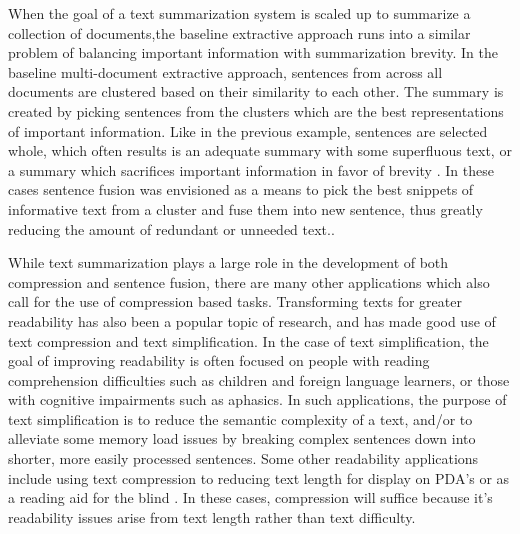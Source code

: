 {{When the goal of a text summarization system is scaled up to summarize a collection of documents,the baseline extractive approach runs into a similar problem of balancing important information with summarization brevity. In the baseline multi-document extractive approach, sentences from across all documents are clustered based on their similarity to each other.  The summary is created by picking sentences from the clusters which are the best representations of important information.  Like in the previous example, sentences are selected whole, which often results is an adequate summary with some superfluous text, or a summary which sacrifices important information in favor of brevity \citep{Filippova:2008:SFV:1613715.1613741}. In these cases sentence fusion was envisioned as a means to pick the best snippets of informative text from a cluster and fuse them into new sentence, thus greatly reducing the amount of redundant or unneeded text.\citet{bla}.}

{While text summarization plays a large role in the development of both compression and sentence fusion, there are many other applications which also call for the use of compression based tasks.  Transforming texts for greater readability has also been a popular topic of research, and has made good use of text compression and text simplification.  In the case of text simplification, the goal of improving readability is often focused on people with reading comprehension difficulties such as children and foreign language learners, or those with cognitive impairments such as aphasics\citep{Feng2008}. In such applications, the purpose of text simplification is to reduce the semantic complexity of a text, and/or to alleviate some memory load issues by breaking complex sentences down into shorter, more easily processed sentences.  Some other readability applications include using text compression to reducing text length for display on PDA's \citep{Corston-Oliver 2001} or as a reading aid for the blind \citep{Grefenstette 1998}.  In these cases, compression will suffice because it's readability issues arise from text length rather than text difficulty.}
 
 
\iffalse
{Text simplification has also generated interest in the field of information extraction as a means to improve recall for some specialized document collections.  For instance, in the bio-medical field, processing documents using the standard NLP approaches of POS taggers, parse trees, and dependency trees results in poor performance due to the syntactic complexity of academic writing.  By breaking up these long syntactically complex sentences into smaller sentences using text simplification, recall is improved \citep{jonnalagadda2010biosimplify}.}
\fi


}
